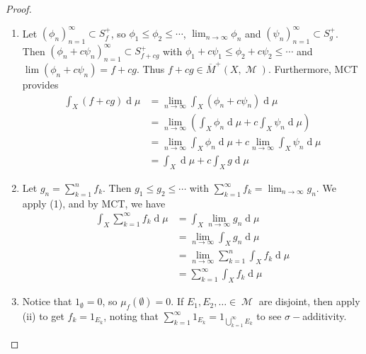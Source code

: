 \documentclass[11pt, a4paper]{memoir}
\newcommand{\ol}[1]{\ensuremath{\overline{#1}}}
\theoremstyle{change}
\theoremstyle{plain}
\theoremstyle{nonumberplain}
\newtheorem{proof}{Proof}
\DeclareMathOperator{\M}{{\mathcal{M}}}
\renewcommand{\d}[1]{\ensuremath{\operatorname{d}\!{#1}}}
\numberwithin{equation}{section}
\begin{document}
\begin{proof}
    \begin{enumerate}
        \item Let $(\phi_n)_{n=1}^\infty\subset S_f^+$, so $\phi_1\leq\phi_2\leq\cdots$, $\lim_{n\to\infty}\phi_n$ and $(\psi_n)_{n=1}^\infty\subset S_g^+$.
            Then $(\phi_n+c\psi_n)_{n=1}^\infty\subset S^+_{f+cg}$ with $\phi_1+c\psi_1\leq\phi_2+c\psi_2\leq\cdots$ and $\lim(\phi_n+c\psi_n)=f+cg$.
            Thus $f+cg\in\ol{M}^+(X,\M)$.
            Furthermore, MCT provides
            \begin{align*}
                \int_X (f+cg)\d{\mu} &= \lim_{n\to\infty}\int_X(\phi_n+c\psi_n)\d{\mu}\\
                                     &= \lim_{n\to\infty}\left(\int_X\phi_n\d{\mu}+c\int_X\psi_n\d{\mu}\right)\\
                                     &= \lim_{n\to\infty}\int_X\phi_n\d{\mu}+c\lim_{n\to\infty}\int_X\psi_n\d{\mu}\\
                                     &= \int_X\d{\mu}+c\int_Xg\d{\mu}
            \end{align*}
        \item Let $g_n=\sum_{k=1}^n f_k$.
            Then $g_1\leq g_2\leq\cdots$ with $\sum_{k=1}^\infty f_k=\lim_{n\to\infty}g_n$.
            We apply (1), and by MCT, we have
            \begin{align*}
                \int_X\sum\limits_{k=1}^\infty f_k\d{\mu} &=\int_X\lim_{n\to\infty} g_n\d{\mu}\\
                                                          &=\lim_{n\to\infty}\int_X g_n\d{\mu}\\
                                                          &=\lim_{n\to\infty}\sum\limits_{k=1}^n\int_Xf_k\d{\mu}\\
                                                          &=\sum\limits_{k=1}^\infty\int_X f_k\d{\mu}
            \end{align*}
        \item Notice that $1_\emptyset=0$, so $\mu_f(\emptyset)=0$.
            If $E_1,E_2,\ldots\in\M$ are disjoint, then apply (ii) to get $f_k=1_{E_k}$, noting that $\sum_{k=1}^\infty 1_{E_k}=1_{\bigcup_{k=1}^\infty E_k}$ to see $\sigma-$additivity.
    \end{enumerate}
\end{proof}
\end{document}
